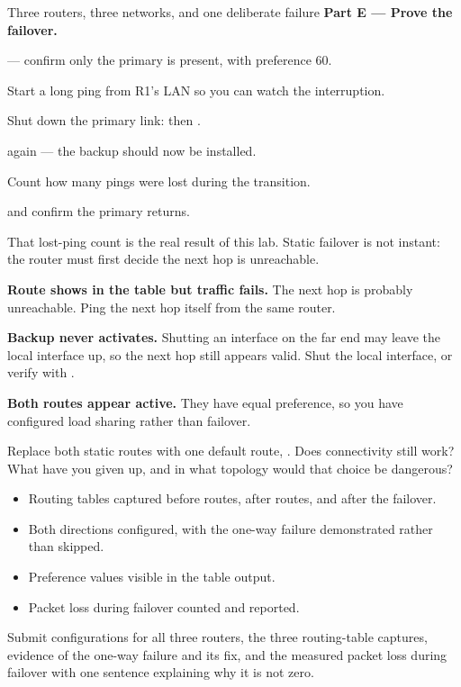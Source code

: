\begin{labproject}{Three routers, three networks, and one deliberate failure}
\medskip\noindent\textbf{Part E --- Prove the failover.}\par

\begin{netsteps}
  \item {} --- confirm only the primary is present, with preference 60.
  \item Start a long ping from R1's LAN so you can watch the interruption.
  \item Shut down the primary link:  then .
  \item {} again --- the backup should now be installed.
  \item Count how many pings were lost during the transition.
  \item {} and confirm the primary returns.
\end{netsteps}

That lost-ping count is the real result of this lab. Static failover is not instant: the router must first decide the next hop is unreachable.

\begin{troubleshoot}
\textbf{Route shows in the table but traffic fails.} The next hop is probably unreachable. Ping the next hop itself from the same router.

\textbf{Backup never activates.} Shutting an interface on the far end may leave the local interface up, so the next hop still appears valid. Shut the local interface, or verify with .

\textbf{Both routes appear active.} They have equal preference, so you have configured load sharing rather than failover.
\end{troubleshoot}

\begin{tryit}
Replace both static routes with one default route, . Does connectivity still work? What have you given up, and in what topology would that choice be dangerous?
\end{tryit}
\end{labproject}

\begin{verifybox}
\begin{itemize}
  \item Routing tables captured before routes, after routes, and after the failover.
  \item Both directions configured, with the one-way failure demonstrated rather than skipped.
  \item Preference values visible in the table output.
  \item Packet loss during failover counted and reported.
\end{itemize}
\end{verifybox}

\begin{labdeliverable}
Submit configurations for all three routers, the three routing-table captures, evidence of the one-way failure and its fix, and the measured packet loss during failover with one sentence explaining why it is not zero.
\end{labdeliverable}
